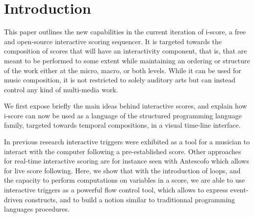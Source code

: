 \documentclass{article}
\title{\papertitle}
\begin{document}
%
\capstartfalse
\maketitle
\capstarttrue
%
\begin{abstract}
     The development and authoring of interactive music or applications, such as user interfaces for arts \& exhibitions
     has traditionally been done with tools that pertain to two broad metaphors. 
     Cue-based environments work by making groups of parameters and sending them to remote devices, 
     while more interactive applications are generally written in generic art-oriented 
     programming environments, such as Max/MSP, Processing or OpenFrameworks.
     In this paper, we argue about the specific issues that arise in such environments, and we present 
     the current version of the i-score sequencer. It is an extensive software suite that bridges
     the gap between time-based, logic-based and flow-based interactive application authoring tools. 
     This is done in a single cohesive graphical user interface, built upon a few simple and novel primitives that give to the composer the expressive power of structured programming, in a time line adapted to the notation of parameter-oriented interactive music.    
\end{abstract}
%

\section{Introduction}\label{sec:introduction}
This paper outlines the new capabilities in the current iteration of i-score, 
a free and open-source interactive scoring sequencer.
It is targeted towards the composition of scores that will have 
an interactivity component, that is, that are meant to be performed 
to some extent while maintaining an ordering or structure of the work either at the micro, macro, or both levels.
While it can be used for music composition, it is not restricted to solely auditory arts
but can instead control any kind of multi-media work.

We first expose briefly the main ideas behind interactive scores, and explain 
how i-score can now be used as a language of the structured programming language 
family, targeted towards temporal compositions, in a visual time-line interface.

In previous research\cite{hogue2014ossia,allombert2006concurrent} interactive triggers 
were exhibited as a tool for a musician to interact with the computer following a pre-established score.
Other approaches for real-time interactive scoring are for instance seen with Antescofo\cite{cont2008antescofo}
 which allows for live score following.
Here, we show that with the introduction of loops, and the capacity to perform computations 
on variables in a score, we are able to use interactive triggers as a powerful flow control tool, which 
allows to express event-driven constructs, and to build a notion similar to traditionnal programming 
languages procedures.
\end{document}
